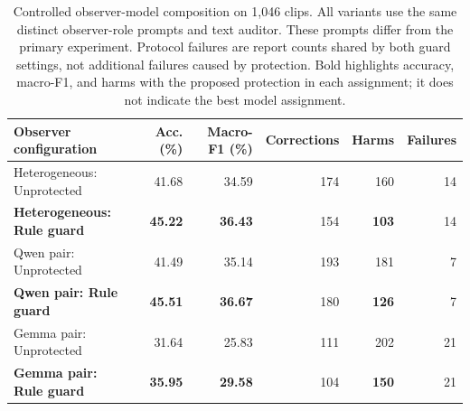 \begin{table}[pos=t]
\caption{Controlled observer-model composition on 1,046 clips. All variants use the same distinct observer-role prompts and text auditor. These prompts differ from the primary experiment. Protocol failures are report counts shared by both guard settings, not additional failures caused by protection. Bold highlights accuracy, macro-F1, and harms with the proposed protection in each assignment; it does not indicate the best model assignment.}
\label{tab:model_composition}
\centering\small
\begin{tabular}{@{}lrrrrr@{}}
\toprule
Observer configuration & Acc. (\%) & Macro-F1 (\%) & Corrections & Harms & Failures \\
\midrule
Heterogeneous: Unprotected & 41.68 & 34.59 & 174 & 160 & 14 \\
\textbf{Heterogeneous: Rule guard} & \textbf{45.22} & \textbf{36.43} & 154 & \textbf{103} & 14 \\
Qwen pair: Unprotected & 41.49 & 35.14 & 193 & 181 & 7 \\
\textbf{Qwen pair: Rule guard} & \textbf{45.51} & \textbf{36.67} & 180 & \textbf{126} & 7 \\
Gemma pair: Unprotected & 31.64 & 25.83 & 111 & 202 & 21 \\
\textbf{Gemma pair: Rule guard} & \textbf{35.95} & \textbf{29.58} & 104 & \textbf{150} & 21 \\
\bottomrule
\end{tabular}
\end{table}
